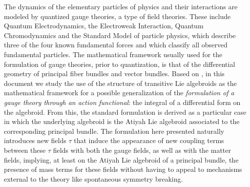 
The dynamics of the elementary particles of physics and their interactions are modeled by quantized gauge theories, a type of field theories. These include Quantum Electrodynamics, the Electroweak Interaction, Quantum Chromodynamics and the Standard Model of particle physics, which describe three of the four known fundamental forces and which classify all observed fundamental particles. The mathematical framework usually used for the formulation of gauge theories, prior to quantization, is that of the differential geometry of principal fiber bundles and vector bundles. Based on \cite{Fournel2013, Fournel2011, Lazzarini2012}, in this document we study the use of the structure of transitive Lie algebroids as the mathematical framework for a possible generalization of the \textit{formulation of a gauge theory through an action functional}: the integral of a differential form on the algebroid. From this, the standard formulation is derived as a particular case in which the underlying algebroid is the Atiyah Lie algebroid associated to the corresponding principal bundle. The formulation here presented naturally introduces new fields $\tau$ that induce the appearance of new coupling terms between these $\tau$ fields with both the gauge fields, as well as with the matter fields, implying, at least on the Atiyah Lie algebroid of a principal bundle, the presence of mass terms for these fields without having to appeal to mechanisms external to the theory like spontaneous symmetry breaking.


